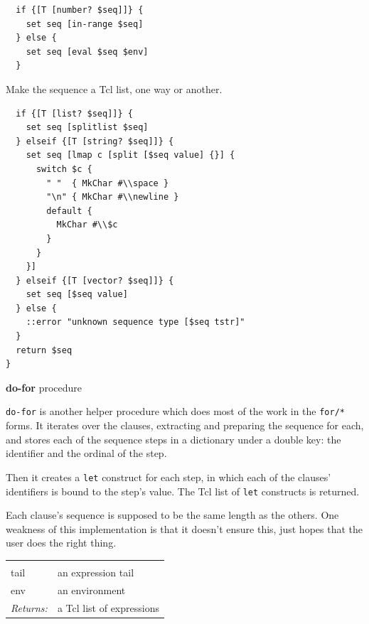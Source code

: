 \documentclass[a5paper,draft]{memoir}
\begin{document}
\begin{lstlisting}
  if {[T [number? $seq]]} {
    set seq [in-range $seq]
  } else {
    set seq [eval $seq $env]
  }
\end{lstlisting}

Make the sequence a Tcl list, one way or another.

\begin{lstlisting}
  if {[T [list? $seq]]} {
    set seq [splitlist $seq]
  } elseif {[T [string? $seq]]} {
    set seq [lmap c [split [$seq value] {}] {
      switch $c {
        " "  { MkChar #\\space }
        "\n" { MkChar #\\newline }
        default {
          MkChar #\\$c
        }
      }
    }]
  } elseif {[T [vector? $seq]]} {
    set seq [$seq value]
  } else {
    ::error "unknown sequence type [$seq tstr]"
  }
  return $seq
}
\end{lstlisting}

\textbf{do-for} procedure

\texttt{do-for} is another helper procedure which does most of the work in the \texttt{for/*} forms. It iterates over the clauses, extracting and preparing the sequence for each, and stores each of the sequence steps in a dictionary under a double key: the identifier and the ordinal of the step.

Then it creates a \texttt{let} construct for each step, in which each of the clauses' identifiers is bound to the step's value. The Tcl list of \texttt{let} constructs is returned.

Each clause's sequence is supposed to be the same length as the others. One weakness of this implementation is that it doesn't ensure this, just hopes that the user does the right thing.

\noindent\begin{tabular}{ |p{1.9cm} p{6.5cm}| }
\hline
\rowcolor[HTML]{CCCCCC} \multicolumn{2}{|l|}{\textbf{do-for (internal)}} \\
tail & an expression tail \\
env & an environment \\
\textit{Returns:} & a Tcl list of expressions \\
\hline
\end{tabular}
\end{document}
